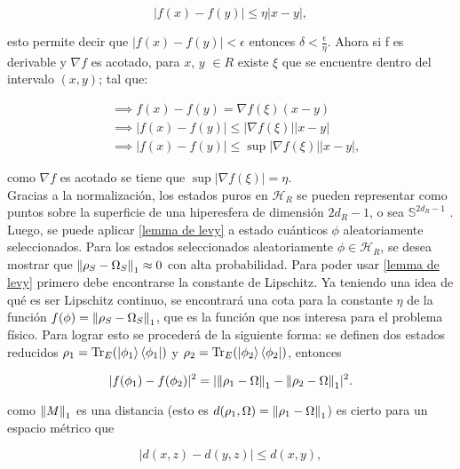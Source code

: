 \begin{equation}
|f(x) -f(y)| \leq \eta |x-y|,
\end{equation}

esto permite decir que  $|f(x)-f(y)| < \epsilon $ entonces $\delta < \frac{\epsilon}{\eta} $. Ahora si f es derivable y $\nabla f$ es acotado, para $x$, $y$ $ \in R$ existe $\xi$ que se encuentre dentro del intervalo $(x,y)$; tal que:


\begin{align}
&\implies f(x)-f(y) = \nabla f(\xi) (x-y) \\
&\implies |f(x)- f(y)| \le |\nabla f(\xi)| |x-y| \\
&\implies |f(x)- f(y)| 	\le \sup|\nabla f(\xi)| |x-y|,
\end{align}

como $\nabla f$ es acotado se tiene que $\sup |\nabla f(\xi)|=\eta$.\\

Gracias a la normalización, los estados puros en $\mathcal{H}_{R}$ se pueden representar como puntos sobre la superficie de una hiperesfera de dimensión $2d_{R}-1$, o sea  $\mathbb{S}^{2d_{R}-1}$ \cite{SakuraiQuantum}. Luego, se puede aplicar \ref{lemma de levy} a estado cuánticos $\phi$ aleatoriamente seleccionados. Para los estados seleccionados aleatoriamente $\phi \in \mathcal{H}_{R}$, se desea mostrar que $\norm{\rho_{S}- \Omega_{S}}_{1} \approx 0$ con alta probabilidad. Para poder usar \ref{lemma de levy} primero  debe encontrarse la constante de Lipschitz. Ya teniendo una idea de qué es ser Lipschitz continuo, se encontrará una cota para la constante $\eta$ de la función $f(\phi)=\norm{\rho_{S}-\Omega_{S}}_{1}$, que es la función que nos interesa para el problema físico. Para lograr esto se procederá de la siguiente forma: se definen dos estados reducidos $\rho_{1}= \Tr_{E} (\ket{\phi_{1}} \bra{\phi_{1}})$ y $\rho_{2}= \Tr_{E}(\ket{\phi_{2}} \bra{\phi_{2}})$, entonces

\begin{equation}
|f(\phi_{1})-f(\phi_{2})|^2= |\norm{\rho_{1}-\Omega}_{1} - \norm{\rho_{2}-\Omega}_{1}|^2.
\end{equation}

como $\norm{M}_{1}$ es una distancia (esto es $d(\rho_{1},\Omega)= \norm{\rho_{1}-\Omega}_{1}$) es cierto para un espacio métrico que

\begin{equation}
|d(x,z)-d(y,z)| \le d(x,y),
\end{equation}

